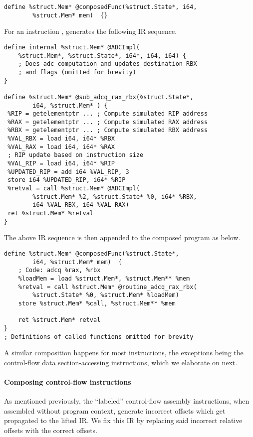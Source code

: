 \begin{lstlisting}[style=LLVM]
define %struct.Mem* @composedFunc(%struct.State*, i64, 
        %struct.Mem* mem)  {}
\end{lstlisting}

For an instruction , \mcsema generates the following
IR sequence.

\begin{lstlisting}[style=LLVM]
define internal %struct.Mem* @ADCImpl(
    %struct.Mem*, %struct.State*, i64*, i64, i64) {
    ; Does adc computation and updates destination RBX
    ; and flags (omitted for brevity)
}

define %struct.Mem* @sub_adcq_rax_rbx(%struct.State*, 
        i64, %struct.Mem* ) {
 %RIP = getelementptr ... ; Compute simulated RIP address
 %RAX = getelementptr ... ; Compute simulated RAX address
 %RBX = getelementptr ... ; Compute simulated RBX address
 %VAL_RBX = load i64, i64* %RBX
 %VAL_RAX = load i64, i64* %RAX
 ; RIP update based on instruction size
 %VAL_RIP = load i64, i64* %RIP
 %UPDATED_RIP = add i64 %VAL_RIP, 3
 store i64 %UPDATED_RIP, i64* %RIP
 %retval = call %struct.Mem* @ADCImpl(
        %struct.Mem* %2, %struct.State* %0, i64* %RBX,
        i64 %VAL_RBX, i64 %VAL_RAX)
 ret %struct.Mem* %retval
}
\end{lstlisting}

The above IR sequence is then appended to the composed program as below.

\begin{lstlisting}[style=LLVM]
define %struct.Mem* @composedFunc(%struct.State*, 
        i64, %struct.Mem* mem)  {
    ; Code: adcq %rax, %rbx	
    %loadMem = load %struct.Mem*, %struct.Mem** %mem
    %retval = call %struct.Mem* @routine_adcq_rax_rbx(
        %struct.State* %0, %struct.Mem* %loadMem)
    store %struct.Mem* %call, %struct.Mem** %mem

    ret %struct.Mem* retval
}
; Definitions of called functions omitted for brevity
\end{lstlisting}

A similar composition happens for most instructions, the exceptions being the control-flow
data section-accessing instructions, which we elaborate on next.

\paragraph{Composing control-flow instructions} As mentioned previously, the
``labeled'' control-flow assembly instructions, when assembled without program
context, generate incorrect offsets which get propagated to the lifted IR.
We fix this IR by replacing said incorrect relative offsets with the correct
offsets.

